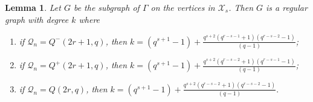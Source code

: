\documentclass[12pt]{article}
\newtheorem{lemma}[theorem]{Lemma}
\newcommand{\X}{\mathcal X}
\newcommand{\Q}{\mathscr Q}
\newcommand{\Label}{\label}
\begin{document}
\begin{lemma}\Label{lemma-ell-2} 
Let $G$ be the subgraph of $\Gamma$ on the vertices in   $\X_s$. Then $G$ is a regular graph with degree $k$ where
\begin{enumerate}
\item if $\Q_n=Q^-(2r+1,q)$, then 
$\displaystyle k=(q^{s+1}-1)+\frac{q^{s+2}(q^{r-s-1}+1)(q^{r-s-2}-1)}{(q-1)}$;\\[1mm]
\item if $\Q_n=Q^+(2r+1,q)$, then 
$\displaystyle k=(q^{s+1}-1)+\frac{q^{s+2}(q^{r-s-2}+1)(q^{r-s-1}-1)}{(q-1)}$;\\[1mm]
\item if $\Q_n=Q(2r,q)$, then 
$\displaystyle k=(q^{s+1}-1)+\frac{q^{s+2}(q^{r-s-2}+1)(q^{r-s-2}-1)}{(q-1)}.$
\end{enumerate}
\end{lemma}
\end{document}
